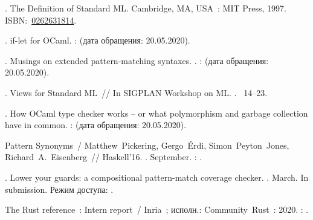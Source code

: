 \begin{thebibliography}{10}
. The Definition of Standard
  ML. \BibDash
\newblock Cambridge, MA, USA~: MIT Press, 1997. \BibDash
\newblock
  ISBN:~\href{http://isbndb.com/search-all.html?kw=0262631814}{0262631814}.

. if-let for OCaml. \BibDash
{}:
   ({дата
  обращения}: 20.05.2020).

. Musings on extended pattern-matching syntaxes.
  \BibDash
{}. \BibDash
{}:
  ({дата обращения}: 20.05.2020).

. Views for Standard ML~// In SIGPLAN Workshop on ML.
  \BibDash
{}. \BibDash
{}~14--23.

. How OCaml type checker works -- or what polymorphism
  and garbage collection have in common. \BibDash
{}:
   ({дата
  обращения}: 20.05.2020).

Pattern Synonyms~/ Matthew~Pickering, Gergo~Érdi, Simon~Peyton~Jones,
  Richard~A.~Eisenberg~// Haskell'16. \BibDash
{}. \BibDash September. \BibDash
{}:
  .

. Lower your guards: a
  compositional pattern-match coverage checker. \BibDash
{}. \BibDash March. \BibDash
\newblock In submission. {Режим доступа}:
  .

{The Rust reference}~: Intern report~/ {Inria}~; {исполн.}:
  Community~Rust~: 2020. \BibDash
{}:
  .


\end{thebibliography}
